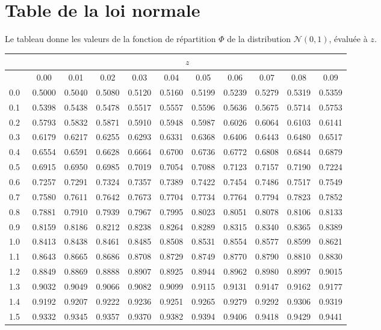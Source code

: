 \section{Table de la loi normale}
\label{chap:normale}

Le tableau donne les valeurs de la fonction de r\'epartition $\Phi$ de la distribution $\mathcal{N}(0,1)$, \'evalu\'ee \`a $z$.

\begin{small}
\begin{center}
\setlength{\tabcolsep}{4.75pt}
\begin{tabular}{|l|cccccccccc|}
\multicolumn{1}{c}{$~~~~~~~~$}& \multicolumn{10}{c}{$z$}\\
\hline
      &0.00&0.01&0.02&0.03&0.04&0.05&0.06&0.07&0.08&0.09\\
\hline
0.0&0.5000&0.5040&0.5080&0.5120&0.5160&0.5199&0.5239&0.5279&0.5319&0.5359\\
0.1&0.5398&0.5438&0.5478&0.5517&0.5557&0.5596&0.5636&0.5675&0.5714&0.5753\\
0.2&0.5793&0.5832&0.5871&0.5910&0.5948&0.5987&0.6026&0.6064&0.6103&0.6141\\
0.3&0.6179&0.6217&0.6255&0.6293&0.6331&0.6368&0.6406&0.6443&0.6480&0.6517\\
0.4&0.6554&0.6591&0.6628&0.6664&0.6700&0.6736&0.6772&0.6808&0.6844&0.6879\\
0.5&0.6915&0.6950&0.6985&0.7019&0.7054&0.7088&0.7123&0.7157&0.7190&0.7224\\
0.6&0.7257&0.7291&0.7324&0.7357&0.7389&0.7422&0.7454&0.7486&0.7517&0.7549\\
0.7&0.7580&0.7611&0.7642&0.7673&0.7704&0.7734&0.7764&0.7794&0.7823&0.7852\\
0.8&0.7881&0.7910&0.7939&0.7967&0.7995&0.8023&0.8051&0.8078&0.8106&0.8133\\
0.9&0.8159&0.8186&0.8212&0.8238&0.8264&0.8289&0.8315&0.8340&0.8365&0.8389\\[6pt]
1.0&0.8413&0.8438&0.8461&0.8485&0.8508&0.8531&0.8554&0.8577&0.8599&0.8621\\
1.1&0.8643&0.8665&0.8686&0.8708&0.8729&0.8749&0.8770&0.8790&0.8810&0.8830\\
1.2&0.8849&0.8869&0.8888&0.8907&0.8925&0.8944&0.8962&0.8980&0.8997&0.9015\\
1.3&0.9032&0.9049&0.9066&0.9082&0.9099&0.9115&0.9131&0.9147&0.9162&0.9177\\
1.4&0.9192&0.9207&0.9222&0.9236&0.9251&0.9265&0.9279&0.9292&0.9306&0.9319\\
1.5&0.9332&0.9345&0.9357&0.9370&0.9382&0.9394&0.9406&0.9418&0.9429&0.9441\\

\end{tabular}
\end{center}
\end{small}
